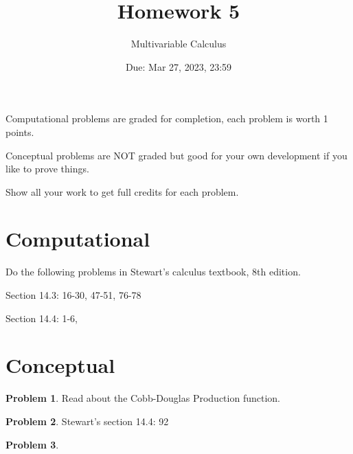 \documentclass[12pt]{article}
\title{Homework 5}
\author{ Multivariable Calculus}
\date{Due: Mar 27, 2023, 23:59}
\theoremstyle{definition}
\newtheorem{problem}{Problem}
\begin{document}
\maketitle

Computational problems are graded for completion, each problem is worth 1 points.

Conceptual problems are NOT graded but good for your own development if you like to prove things.

Show all your work to get full credits for each problem.
\section{Computational}
Do the following problems in Stewart's calculus textbook, 8th edition.

Section 14.3: 16-30, 47-51, 76-78

Section 14.4: 1-6, 



\section{Conceptual}

\begin{problem}
    Read about the Cobb-Douglas Production function.
\end{problem}

\begin{problem}
    Stewart's section 14.4: 92
\end{problem}

\begin{problem}

\end{problem}

%
\end{document}
